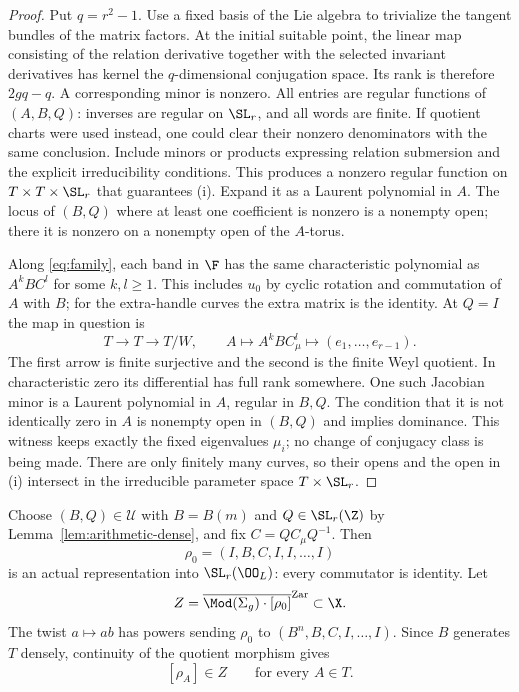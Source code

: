 \begin{proof}
Put $q=r^2-1$. Use a fixed basis of the Lie algebra to trivialize the
tangent bundles of the matrix factors. At the initial suitable point, the
linear map consisting of the relation derivative together with the
selected invariant derivatives has kernel the $q$-dimensional conjugation
space. Its rank is therefore $2gq-q$. A corresponding minor is nonzero.
All entries are regular functions of $(A,B,Q)$: inverses are regular on
$\SL_r$, and all words are finite. If quotient charts were used instead,
one could clear their nonzero denominators with the same conclusion.
Include minors or products expressing relation submersion and the explicit
irreducibility conditions. This produces a nonzero regular function on
$T\times T\times\SL_r$ that guarantees (i). Expand it as a Laurent
polynomial in $A$. The locus of $(B,Q)$ where at least one coefficient
is nonzero is a nonempty open; there it is nonzero on a nonempty open
of the $A$-torus.

Along \eqref{eq:family}, each band in $\F$ has the same characteristic
polynomial as $A^kBC^l$ for some $k,l\geq1$. This includes $u_0$ by
cyclic rotation and commutation of $A$ with $B$; for the extra-handle
curves the extra matrix is the identity. At $Q=I$ the map in question is
\[
 T\longrightarrow T\longrightarrow T/W,\qquad
 A\longmapsto A^kBC_\mu^l\longmapsto(e_1,\ldots,e_{r-1}).
\]
The first arrow is finite surjective and the second is the finite Weyl
quotient. In characteristic zero its differential has full rank somewhere.
One such Jacobian minor is a Laurent polynomial in $A$, regular in $B,Q$.
The condition that it is not identically zero in $A$ is nonempty open
in $(B,Q)$ and implies dominance. This witness keeps exactly the fixed
eigenvalues $\mu_i$; no change of conjugacy class is being made.
There are only finitely many curves, so their opens and the open in (i)
intersect in the irreducible parameter space $T\times\SL_r$.
\end{proof}

Choose $(B,Q)\in\mathcal U$ with $B=B(m)$ and $Q\in\SL_r(\Z)$ by
Lemma~\ref{lem:arithmetic-dense}, and fix $C=QC_\mu Q^{-1}$. Then
\begin{equation}\label{eq:seed}
 \rho_0=(I,B,C,I,I,\ldots,I)
\end{equation}
is an actual representation into $\SL_r(\OO_L)$: every commutator is
identity. Let
\[
 Z=\overline{\Mod(\Sigma_g)\cdot[\rho_0]}^{\mathrm{Zar}}\subset\X.
\]
The twist $a\mapsto ab$ has powers sending $\rho_0$ to
$(B^n,B,C,I,\ldots,I)$. Since $B$ generates $T$ densely, continuity of
the quotient morphism gives
\begin{equation}\label{eq:torus-in-closure}
 [\rho_A]\in Z\qquad\text{for every }A\in T.
\end{equation}

